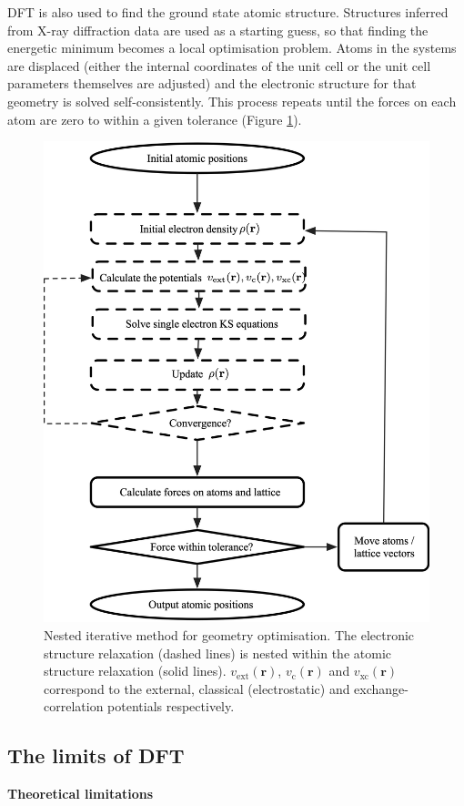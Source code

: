DFT is also used to find the ground state atomic structure. Structures inferred from X-ray diffraction data are used as a starting guess, so that finding the energetic minimum becomes a local optimisation problem. Atoms in the systems are displaced (either the internal coordinates of the unit cell or the unit cell parameters themselves are adjusted) and the electronic structure for that geometry is solved self-consistently. This process repeats until the forces on each atom are zero to within a given tolerance (Figure \ref{SCF}). 

\begin{figure}[h]
\centering
  \includegraphics[width=0.7\columnwidth]{figures/ch3/scf.png}
  \caption[Nested iterative method for geometry optimisation]{Nested iterative method for geometry optimisation. The electronic structure relaxation (dashed lines) is nested within the atomic structure relaxation (solid lines). $v_\textrm{ext}(\textbf{r})$, $v_\textrm{c}(\textbf{r})$ and $v_\textrm{xc}(\textbf{r})$ correspond to the external, classical (electrostatic) and exchange-correlation potentials respectively.} 
  \label{SCF}
\end{figure}

\subsection{The limits of DFT} \label{numericalsubsection}


\textbf{Theoretical limitations} 

